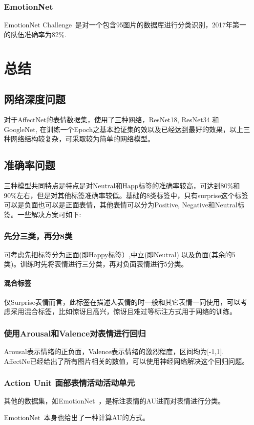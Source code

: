 \documentclass[11pt, a4paper]{article}
\begin{document}
\begin{CJK}{UTF8}{gbsn}
\newpage

\subsubsection{EmotionNet}

EmotionNet Challenge~\cite{ref:emotionnet}是对一个包含95图片的数据库进行分类识别，2017年第一的队伍准确率为82\%.

\section{总结}

\subsection{网络深度问题}

对于AffectNet的表情数据集，使用了三种网络，ResNet18, ResNet34 和 GoogleNet, 在训练一个Epoch之基本验证集的效以及已经达到最好的效果，以上三种网络结构较复杂，可采取较为简单的网络模型。

\subsection{准确率问题}
三种模型共同特点是特点是对Neutral和Happ标签的准确率较高，可达到80\%和90\%左右，但是对其他标签准确率较低。基础的8类标签中，只有surprise这个标签可以是负面也可以是正面表情，其他表情可以分为Positive, Negative和Neutral标签。一些解决方案可如下:

\subsubsection{先分三类，再分8类}
可考虑先把标签分为正面(即Happy标签）,中立(即Neutral) 以及负面(其余的5类)。训练时先将表情进行三分类，再对负面表情进行5分类。

\paragraph{混合标签}
仅Surprise表情而言，此标签在描述人表情的时一般和其它表情一同使用，可以考虑采用混合标签，比如惊讶且高兴，惊讶且难过等标注方式用于网络的训练。

\subsubsection{使用Arousal和Valence对表情进行回归}

Arousal表示情绪的正负面，Valence表示情绪的激烈程度，区间均为[-1,1]. AffectNe已经给出了所有图片相关的数值，可以使用神经网络解决这个回归问题。

\subsubsection{Action Unit 面部表情活动活动单元}

其他的数据集，如EmotionNet~\cite{ref:emotionnet}，是标注表情的AU进而对表情进行分类。

EmotionNet~\cite{ref:en1}本身也给出了一种计算AU的方式。





\end{CJK}
\end{document}

